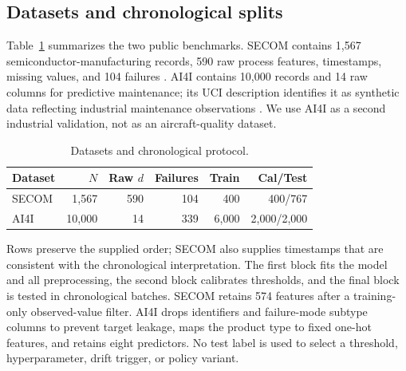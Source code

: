 \documentclass[journal]{IEEEtran}
\begin{document}
\subsection{Datasets and chronological splits}
Table~\ref{tab:data} summarizes the two public benchmarks. SECOM contains 1,567 semiconductor-manufacturing records, 590 raw process features, timestamps, missing values, and 104 failures \cite{uci_secom}. AI4I contains 10,000 records and 14 raw columns for predictive maintenance; its UCI description identifies it as synthetic data reflecting industrial maintenance observations \cite{uci_ai4i}. We use AI4I as a second industrial validation, not as an aircraft-quality dataset.

\begin{table}[t]
\centering
\caption{Datasets and chronological protocol.}
\label{tab:data}
\small
\begin{tabular}{lrrrrr}
\toprule
Dataset & $N$ & Raw $d$ & Failures & Train & Cal/Test \\
\midrule
SECOM & 1,567 & 590 & 104 & 400 & 400/767 \\
AI4I & 10,000 & 14 & 339 & 6,000 & 2,000/2,000 \\
\bottomrule
\end{tabular}
\end{table}

Rows preserve the supplied order; SECOM also supplies timestamps that are consistent with the chronological interpretation. The first block fits the model and all preprocessing, the second block calibrates thresholds, and the final block is tested in chronological batches. SECOM retains 574 features after a training-only observed-value filter. AI4I drops identifiers and failure-mode subtype columns to prevent target leakage, maps the product type to fixed one-hot features, and retains eight predictors. No test label is used to select a threshold, hyperparameter, drift trigger, or policy variant.
\end{document}
